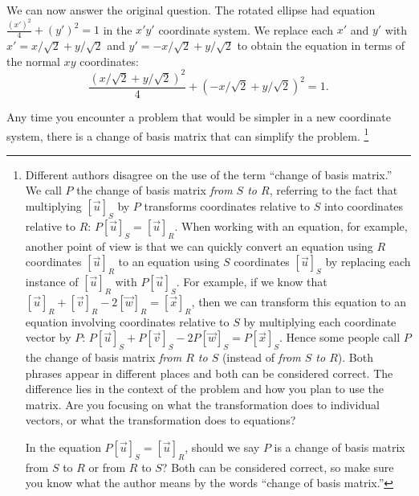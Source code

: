 \begin{example}
We can now answer the original question.  
The rotated ellipse had equation $\frac{(x')^2}{4}+(y')^2=1$ in the $x'y'$ coordinate system.  
We replace each $x'$ and $y'$ with $x'=x/\sqrt2+y/\sqrt2$ and $y'=-x/\sqrt2+y/\sqrt2$ to obtain the equation in terms of the normal $xy$ coordinates: $$\frac{(x/\sqrt2+y/\sqrt2)^2}4+(-x/\sqrt2+y/\sqrt2)^2=1.$$
\end{example}

Any time you encounter a problem that would be simpler in a new coordinate system, there is a change of basis matrix that can simplify the problem. 
\footnote{Different authors disagree on the use of the term ``change of basis matrix.'' 
We call $P$ the change of basis matrix \emph{from $S$ to $R$}, referring to the fact that multiplying $[\vec u]_S$ by $P$ transforms coordinates relative to $S$ into coordinates relative to $R$: $P[\vec u]_S=[\vec u]_R$.  
When working with an equation, for example, another point of view is that we can quickly convert an equation using $R$ coordinates $[\vec u]_{R}$ to an equation using $S$ coordinates $[\vec u]_S$ by replacing each instance of $[\vec u]_{R}$ with $P[\vec u]_S$.  For example, if we know that $[\vec u]_R+[\vec v]_R-2[\vec w]_R=[\vec x]_R$, then we can transform this equation to an equation involving coordinates relative to $S$ by multiplying each coordinate vector by $P$: $P[\vec u]_S+P[\vec v]_S-2P[\vec w]_S=P[\vec x]_S$.  Hence some people call $P$ the change of basis matrix \emph{from $R$ to $S$} (instead of \emph{from $S$ to $R$}).
Both phrases appear in different places and both can be considered correct. The difference lies in the context of the problem and how you plan to use the matrix. Are you focusing on what the transformation does to individual vectors, or what the transformation does to equations? 

In the equation $P[\vec u]_S = [\vec u]_{R}$, should we say $P$ is a change of basis matrix from $S$ to $R$ or from $R$ to $S$? Both can be considered correct, so make sure you know what the author means by the words ``change of basis matrix.''
}

